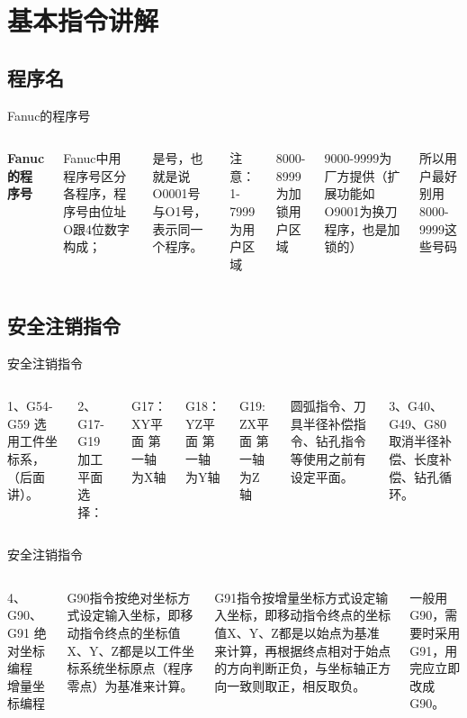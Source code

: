 \documentclass[UTF8,zihao=-4]{ctexbeamer}
\begin{document}
\section{基本指令讲解}
\subsection{程序名}
\begin{frame}{Fanuc的程序号}
    \begin{columns}
        \column{\textwidth}
\textbf{Fanuc的程序号}

Fanuc中用程序号区分各程序，程序号由位址O跟4位数字构成；

是号，也就是说O0001号与O1号，表示同一个程序。

注意：1-7999为用户区域

8000-8999为加锁用户区域

9000-9999为厂方提供（扩展功能如O9001为换刀程序，也是加锁的）

所以用户最好别用8000-9999这些号码
    \end{columns}
\end{frame}

\subsection{安全注销指令}
\begin{frame}{安全注销指令}
    \begin{columns}
        \column{\textwidth}
        
       1、G54-G59  选用工件坐标系，（后面讲）。
       
       2、G17-G19  加工平面选择：
       
       G17：XY平面 第一轴为X轴
       
       G18：YZ平面 第一轴为Y轴
       
       G19: ZX平面 第一轴为Z轴
       
       圆弧指令、刀具半径补偿指令、钻孔指令等使用之前有设定平面。
       
       3、G40、G49、G80 取消半径补偿、长度补偿、钻孔循环。
    \end{columns}
\end{frame}



\begin{frame}{安全注销指令}
    \begin{columns}
        \column{\textwidth}
        
   4、G90、G91 绝对坐标编程 增量坐标编程
   
   G90指令按绝对坐标方式设定输入坐标，即移动指令终点的坐标值X、Y、Z都是以工件坐标系统坐标原点（程序零点）为基准来计算。
   
   G91指令按增量坐标方式设定输入坐标，即移动指令终点的坐标值X、Y、Z都是以始点为基准来计算，再根据终点相对于始点的方向判断正负，与坐标轴正方向一致则取正，相反取负。
   
   一般用G90，需要时采用G91，用完应立即改成G90。
    \end{columns}
\end{frame}
\end{document}
